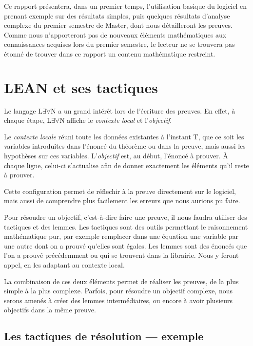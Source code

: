 \documentclass[a4paper, 11pt, twoside]{report}
\newcommand{\LEAN}{L$\exists\forall$N }
\begin{document}
\bigskip

Ce rapport présentera, dans un premier temps, l'utilisation basique du logiciel en prenant exemple sur des résultats simples, puis quelques résultats d'analyse complexe du premier semestre de Master, dont nous détailleront les preuves. Comme nous n'apporteront pas de nouveaux éléments mathématiques aux connaissances acquises lors du premier semestre, le lecteur ne se trouvera pas étonné de trouver dans ce rapport un contenu mathématique restreint.

\chapter{LEAN et ses tactiques}

Le langage \LEAN a un grand intérêt lors de l'écriture des preuves. En effet, à chaque étape, \LEAN affiche le \textit{contexte local} et l'\textit{objectif}. 

Le \textit{contexte locale} réuni toute les données existantes à l'instant T, que ce soit les variables introduites dans l'énoncé du théorème ou dans la preuve, mais aussi les hypothèses sur ces variables.
L'\textit{objectif} est, au début, l'énoncé à prouver. À chaque ligne, celui-ci s'actualise afin de donner exactement les éléments qu'il reste à prouver. 

Cette configuration permet de réflechir à la preuve directement sur le logiciel, mais aussi de comprendre plus facilement les erreurs que nous aurions pu faire.

Pour résoudre un objectif, c'est-à-dire faire une preuve, il nous faudra utiliser des tactiques et des lemmes. Les tactiques sont des outils permettant le raisonnement mathématique pur, par exemple remplacer dans une équation une variable par une autre dont on a prouvé qu'elles sont égales. Les lemmes sont des énoncés que l'on a prouvé précédemment ou qui se trouvent dans la librairie. Nous y feront appel, en les adaptant au contexte local.

La combinaison de ces deux éléments permet de réaliser les preuves, de la plus simple à la plus complexe. Parfois, pour résoudre un objectif complexe, nous serons amenés à créer des lemmes intermédiaires, ou encore à avoir plusieurs objectifs dans la même preuve.

\section{Les tactiques de résolution --- exemple}
\end{document}
